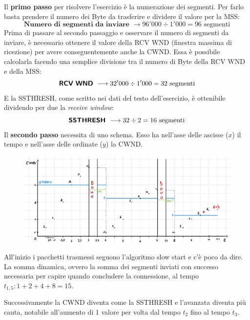 \documentclass[a4paper]{article}
\begin{document}
	\noindent
	Il \textbf{primo passo} per risolvere l’esercizio è la numerazione dei segmenti. Per farlo basta prendere il numero dei Byte da trasferire e dividere il valore per la \textsf{MSS}:
	\begin{equation*}
		\textbf{Numero di segmenti da inviare } \longrightarrow 96'000 \div 1'000 = 96 \text{ segmenti}
	\end{equation*}
	Prima di passare al secondo passaggio e osservare il numero di segmenti da inviare, è necessario ottenere il valore della \textsf{RCV WND} (finestra massima di ricezione) per avere conseguentemente anche la \textsf{CWND}. Essa è possibile calcolarla facendo una semplice divisione tra il numero di Byte della \textsf{RCV WND} e della \textsf{MSS}:
	\begin{equation*}
		\textbf{\textsf{RCV WND} } \longrightarrow 32'000 \div 1'000 = 32 \text{ segmenti}
	\end{equation*}
	E la \textsf{SSTHRESH}, come scritto nei dati del testo dell’esercizio, è ottenibile dividendo per due la \emph{receive window}:
	\begin{equation*}
		\textbf{\textsf{SSTHRESH} } \longrightarrow 32 \div 2 = 16 \text{ segmenti}
	\end{equation*}\newpage
	\noindent
	Il \textbf{secondo passo} necessita di uno schema. Esso ha nell'asse delle ascisse ($x$) il tempo e nell'asse delle ordinate ($y$) la \textsf{CWND}.
	\begin{figure}[!htp]
		\centering
		\includegraphics[width=\textwidth]{img/ex1_congestione.pdf}
	\end{figure}
	
	\noindent
	All’inizio i pacchetti trasmessi seguono l’algoritmo slow start e c’è poco da dire. La somma dinamica, ovvero la somma dei segmenti inviati con successo necessaria per capire quando concludere la connessione, al tempo $t_{1,5}:1+2+4+8=15$.\newline
	
	\noindent
	Successivamente la \textsf{CWND} diventa come la \textsf{SSTHRESH} e l’avanzata diventa più cauta, notabile all’aumento di 1 valore per volta dal tempo $t_{2}$ fino al tempo $t_{3}$.\newline
	
\end{document}
